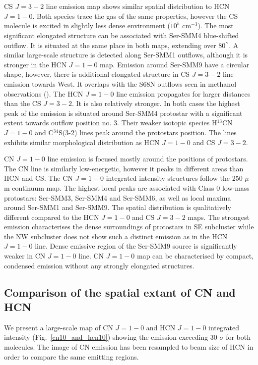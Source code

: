 \documentclass{aa}
\begin{document}
CS $J=3-2$ line emission map shows similar spatial distribution to HCN $J=1-0$. Both species trace the gas of the same properties, however the CS molecule is excited in slightly less dense environment ($\tilde10^5$ cm$^{-3}$). The most significant elongated structure can be associated with Ser-SMM4 blue-shifted outflow. It is situated at the same place in both maps, extending over 80$^{\prime\prime}$. A similar large-scale structure is detected along Ser-SMM1 outflows, although it is stronger in the HCN $J=1-0$ map. Emission around Ser-SMM9 have a circular shape, however, there is additional elongated structure in CS $J=3-2$ line emission towards West. It overlaps with the S68N outflows seen in methanol observations (\cite{Kri10}). The HCN $J=1-0$  line emission propagates for larger distances than the CS $J=3-2$. It is also relatively stronger. In both cases the highest peak of the emission is situated around Ser-SMM4 protostar with a significant extent towards outflow position no. 3. Their weaker isotopic species H$^{13}$CN $J=1-0$ and \mbox{C$^{34}$S(3-2)} lines peak around the protostars position. The lines exhibits similar morphological distribution as HCN $J=1-0$ and CS $J=3-2$.

CN $J=1-0$ line emission is focused mostly around the positions of protostars. The CN line is similarly low-energetic, however it peaks in different areas than HCN and CS. The CN $J=1-0$ integrated intensity structures follow the 250 $\mu$m continuum map. The highest local peaks are associated with Class 0 low-mass protostars: Ser-SMM3, Ser-SMM4 and Ser-SMM6, as well as local maxima around Ser-SMM1 and Ser-SMM9. The spatial distribution is qualitatively different compared to the HCN $J=1-0$ and CS $J=3-2$ maps. The strongest emission characterises the dense surroundings of protostars in SE subcluster while the NW subcluster does not show such a distinct emission as in the HCN $J=1-0$ line. Dense emissive region of the Ser-SMM9 source is significantly weaker in CN $J=1-0$ line. CN $J=1-0$ map can be characterised by compact, condensed emission without any strongly elongated structures. 


\subsection{Comparison of the spatial extant of CN and HCN}

We present a large-scale map of CN $J=1-0$ and HCN $J=1-0$ integrated intensity (Fig.~\ref{cn10_and_hcn10}) showing the emission exceeding 30 $\sigma$ for both molecules. The image of CN emission has been resampled to beam size of HCN in order to compare the same emitting regions. 
\end{document}
